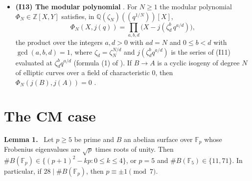 \documentclass[11pt]{article}
\newenvironment{statement}[1]{\par\medskip\noindent\phantomsection\textbf{#1}\ }{\par\medskip}
\newcommand{\Q}{\mathbb Q}
\newcommand{\Z}{\mathbb Z}
\newcommand{\F}{\mathbb F}
\begin{document}
\begin{itemize}
\item \textbf{(I13) The modular polynomial} \cite[Chapter~5, Sections~1--3]{La}. For \(N\ge1\) the modular
polynomial \(\Phi_N\in\Z[X,Y]\) satisfies, in \(\Q(\zeta_N)((q^{1/N}))[X]\),
\[\Phi_N(X,j(q))=\prod_{a,b,d}\bigl(X-j(\zeta_d^b\,q^{a/d})\bigr),\]
the product over the integers \(a,d>0\) with \(ad=N\) and \(0\le b<d\) with \(\gcd(a,b,d)=1\), where
\(\zeta_d=\zeta_N^{N/d}\) and \(j(\zeta_d^bq^{a/d})\) is the series of (I11) evaluated at \(\zeta_d^bq^{a/d}\)
(formula (1) of \cite[Chapter~5, Section~2]{La}). If \(B\to A\) is a cyclic isogeny of degree \(N\) of elliptic curves over a field
of characteristic \(0\), then \(\Phi_N(j(B),j(A))=0\) \cite[Chapter~5, Theorem~5 and the remark following it]{La}.
\end{itemize}

\section{The CM case}\label{cm}

\begin{statement}{Lemma 1.}\label{lemma-ss}
Let \(p\ge5\) be prime and \(B\) an abelian surface over \(\F_p\) whose Frobenius eigenvalues are \(\sqrt p\) times
roots of unity. Then \(\#B(\F_p)\in\{(p+1)^2-kp:0\le k\le4\}\), or \(p=5\) and \(\#B(\F_5)\in\{11,71\}\). In
particular, if \(28\mid\#B(\F_p)\), then \(p\equiv\pm1\pmod7\).
\end{statement}
\end{document}
